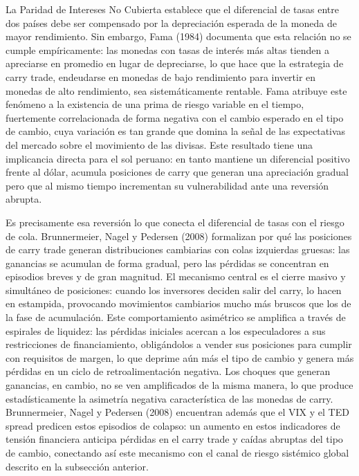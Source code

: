 ﻿\documentclass[11pt,a4paper]{article}
\begin{document}
La Paridad de Intereses No Cubierta establece que el diferencial de tasas entre dos países debe ser compensado por la depreciación esperada de la moneda de mayor rendimiento. Sin embargo, Fama (1984) documenta que esta relación no se cumple empíricamente: las monedas con tasas de interés más altas tienden a apreciarse en promedio en lugar de depreciarse, lo que hace que la estrategia de carry trade, endeudarse en monedas de bajo rendimiento para invertir en monedas de alto rendimiento, sea sistemáticamente rentable. Fama atribuye este fenómeno a la existencia de una prima de riesgo variable en el tiempo, fuertemente correlacionada de forma negativa con el cambio esperado en el tipo de cambio, cuya variación es tan grande que domina la señal de las expectativas del mercado sobre el movimiento de las divisas. Este resultado tiene una implicancia directa para el sol peruano: en tanto mantiene un diferencial positivo frente al dólar, acumula posiciones de carry que generan una apreciación gradual pero que al mismo tiempo incrementan su vulnerabilidad ante una reversión abrupta.

Es precisamente esa reversión lo que conecta el diferencial de tasas con el riesgo de cola. Brunnermeier, Nagel y Pedersen (2008) formalizan por qué las posiciones de carry trade generan distribuciones cambiarias con colas izquierdas gruesas: las ganancias se acumulan de forma gradual, pero las pérdidas se concentran en episodios breves y de gran magnitud. El mecanismo central es el cierre masivo y simultáneo de posiciones: cuando los inversores deciden salir del carry, lo hacen en estampida, provocando movimientos cambiarios mucho más bruscos que los de la fase de acumulación. Este comportamiento asimétrico se amplifica a través de espirales de liquidez: las pérdidas iniciales acercan a los especuladores a sus restricciones de financiamiento, obligándolos a vender sus posiciones para cumplir con requisitos de margen, lo que deprime aún más el tipo de cambio y genera más pérdidas en un ciclo de retroalimentación negativa. Los choques que generan ganancias, en cambio, no se ven amplificados de la misma manera, lo que produce estadísticamente la asimetría negativa característica de las monedas de carry. Brunnermeier, Nagel y Pedersen (2008) encuentran además que el VIX y el TED spread predicen estos episodios de colapso: un aumento en estos indicadores de tensión financiera anticipa pérdidas en el carry trade y caídas abruptas del tipo de cambio, conectando así este mecanismo con el canal de riesgo sistémico global descrito en la subsección anterior.
\end{document}
